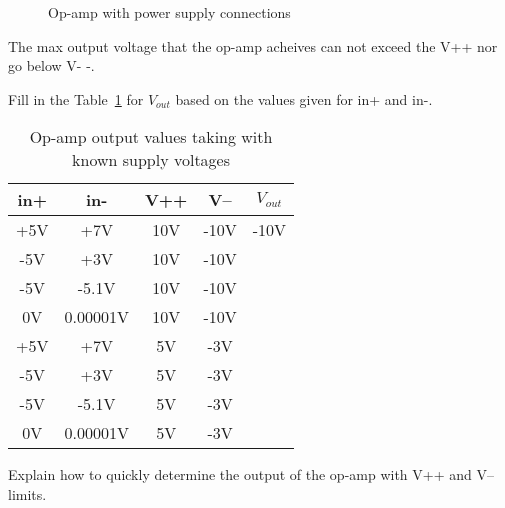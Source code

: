 \begin{figure}[H]
\begin{center}
\caption{Op-amp with power supply connections}
\end{center}
\end{figure}

The max output voltage that the op-amp acheives can not exceed the V++ nor go below V- -.

\begin{blevel}
Fill in the Table~\ref{T:5OP2} for $V_{out}$ based on the values given for in+ and in-.
\end{blevel}

\begin{table}[H]
\begin{center}
\begin{tabular}{|c|c|c|c|c|}\hline
in+&in-&V++&V--&$V_{out}$\\ \hline
+5V&+7V&10V&-10V&-10V \\ \hline
-5V&+3V&10V&-10V& \\ \hline
-5V&-5.1V&10V&-10V& \\ \hline
0V&0.00001V&10V&-10V& \\ \hline
+5V&+7V&5V&-3V& \\ \hline
-5V&+3V&5V&-3V& \\ \hline
-5V&-5.1V&5V&-3V& \\ \hline
0V&0.00001V&5V&-3V& \\ \hline
\end{tabular}
\caption{Op-amp output values taking with known supply voltages}
\label{T:5OP2}
\end{center}
\end{table}

\begin{clevel}
Explain how to quickly determine the output of the op-amp with V++ and V-- limits.
\end{clevel}


